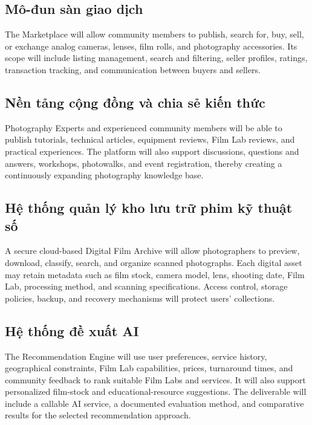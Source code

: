 \subsection*{Mô-đun sàn giao dịch}

The Marketplace will allow community members to publish, search for, buy, sell,
or exchange analog cameras, lenses, film rolls, and photography accessories.
Its scope will include listing management, search and filtering, seller
profiles, ratings, transaction tracking, and communication between buyers and
sellers.

\subsection*{Nền tảng cộng đồng và chia sẻ kiến thức}

Photography Experts and experienced community members will be able to publish
tutorials, technical articles, equipment reviews, Film Lab reviews, and
practical experiences. The platform will also support discussions, questions
and answers, workshops, photowalks, and event registration, thereby creating a
continuously expanding photography knowledge base.

\subsection*{Hệ thống quản lý kho lưu trữ phim kỹ thuật số}

A secure cloud-based Digital Film Archive will allow photographers to preview,
download, classify, search, and organize scanned photographs. Each digital asset
may retain metadata such as film stock, camera model, lens, shooting date, Film
Lab, processing method, and scanning specifications. Access control, storage
policies, backup, and recovery mechanisms will protect users' collections.

\subsection*{Hệ thống đề xuất AI}

The Recommendation Engine will use user preferences, service history,
geographical constraints, Film Lab capabilities, prices, turnaround times, and
community feedback to rank suitable Film Labs and services. It will also
support personalized film-stock and educational-resource suggestions. The
deliverable will include a callable AI service, a documented evaluation method,
and comparative results for the selected recommendation approach.

